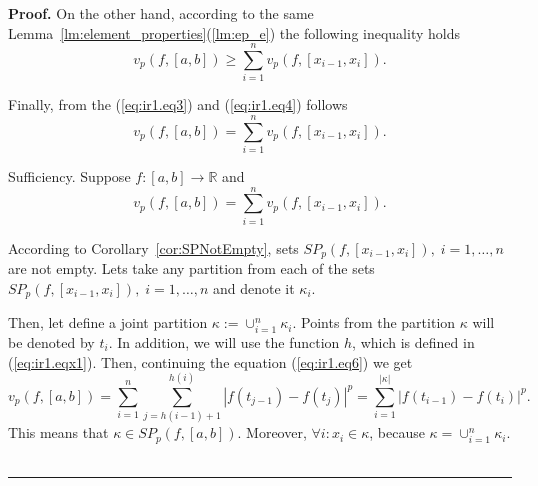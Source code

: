 \documentclass[12pt, a4paper]{article}
\newenvironment{proof}[1][Proof]{\noindent \textbf{#1.} }{\  \rule{0.5em}{0.5em}}
\numberwithin{equation}{section}
\begin{document}
\begin{proof}
  On the other hand, according to the same
  Lemma~\ref{lm:element_properties}(\ref{lm:ep_e}) 
  the following inequality holds
  \begin{equation}\label{eq:ir1.eq4}
    v_p(f,[a,b]) \geq \sum_{i=1}^n v_p(f,[x_{i-1},x_i]).
  \end{equation}
  
  Finally, from the (\ref{eq:ir1.eq3}) and (\ref{eq:ir1.eq4}) follows 
  \begin{equation}\label{eq:ir1.eq5}
    v_p(f,[a,b]) = \sum_{i=1}^n v_p(f,[x_{i-1},x_i]).
  \end{equation}
  
  Sufficiency. Suppose $f:[a,b] \rightarrow \mathbb{R}$ and 
  \begin{equation}\label{eq:ir1.eq6}
    v_p(f,[a,b]) = \sum_{i=1}^n v_p(f,[x_{i-1},x_i]).
  \end{equation}
  
  According to Corollary~\ref{cor:SPNotEmpty}, 
  sets $SP_{p}(f,[x_{i-1},x_i]),\;i=1,\dots,n$ are not empty.  
  Lets take any partition from each of the 
  sets $SP_{p}(f,[x_{i-1},x_i]),\;i=1,\dots,n$ and denote it $\kappa_i$.
    
  
  Then, let define a joint partition $\kappa:=\cup_{i=1}^n \kappa_i$. 
  Points from the partition $\kappa$ will be denoted by $t_i$. 
  In addition, we will use the function $h$, 
  which is defined in (\ref{eq:ir1.eqx1}).
  Then, continuing the equation (\ref{eq:ir1.eq6}) we get
  \begin{equation}\label{eq:ir1.eq7}
  v_p(f,[a,b]) = 
    \sum_{i=1}^n\sum_{j=h(i-1)+1}^{h(i)}|f(t_{j-1})-f(t_j)|^p
    =\sum_{i=1}^{|\kappa|}|f(t_{i-1})-f(t_i)|^p.
  \end{equation}
  This means that $\kappa \in SP_{p}(f,[a,b])$. 
  Moreover, $\forall i:x_i \in \kappa$,
  because $\kappa=\cup_{i=1}^n \kappa_i$.  
\end{proof}
\end{document}
